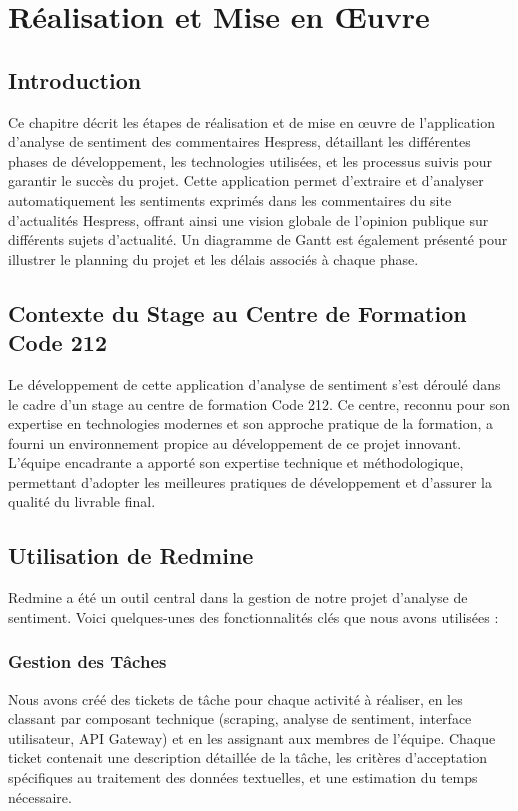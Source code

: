 \chapter{Réalisation et Mise en Œuvre}

\section{Introduction}
Ce chapitre décrit les étapes de réalisation et de mise en œuvre de l'application d'analyse de sentiment des commentaires Hespress, détaillant les différentes phases de développement, les technologies utilisées, et les processus suivis pour garantir le succès du projet. Cette application permet d'extraire et d'analyser automatiquement les sentiments exprimés dans les commentaires du site d'actualités Hespress, offrant ainsi une vision globale de l'opinion publique sur différents sujets d'actualité. Un diagramme de Gantt est également présenté pour illustrer le planning du projet et les délais associés à chaque phase.

\section{Contexte du Stage au Centre de Formation Code 212}
Le développement de cette application d'analyse de sentiment s'est déroulé dans le cadre d'un stage au centre de formation Code 212. Ce centre, reconnu pour son expertise en technologies modernes et son approche pratique de la formation, a fourni un environnement propice au développement de ce projet innovant. L'équipe encadrante a apporté son expertise technique et méthodologique, permettant d'adopter les meilleures pratiques de développement et d'assurer la qualité du livrable final.

\section{Utilisation de Redmine}
Redmine a été un outil central dans la gestion de notre projet d'analyse de sentiment. Voici quelques-unes des fonctionnalités clés que nous avons utilisées :

\subsection{Gestion des Tâches}
Nous avons créé des tickets de tâche pour chaque activité à réaliser, en les classant par composant technique (scraping, analyse de sentiment, interface utilisateur, API Gateway) et en les assignant aux membres de l'équipe. Chaque ticket contenait une description détaillée de la tâche, les critères d'acceptation spécifiques au traitement des données textuelles, et une estimation du temps nécessaire.

